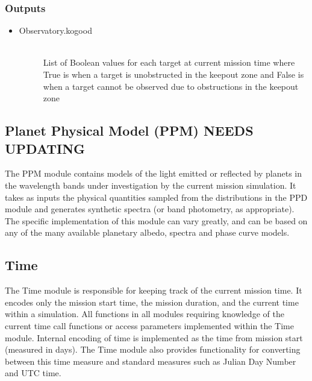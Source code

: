 \documentclass[cleanfoot]{asme2ej}
\begin{document}
\subsubsection*{Outputs}
\begin{itemize}
    \item 
    \begin{description}
        \item[Observatory.kogood] \hfill \\
        List of Boolean values for each target at current mission time where True is when a target is unobstructed in the keepout zone and False is when a target cannot be observed due to obstructions in the keepout zone
    \end{description}
\end{itemize}




\subsection{Planet Physical Model (PPM) NEEDS UPDATING}
The PPM module contains models of the light emitted or reflected by planets in the wavelength bands under investigation by the current mission simulation.  It takes as inputs the physical quantities sampled from the distributions in the PPD module and generates synthetic spectra (or band photometry, as appropriate).  The specific implementation of this module can vary greatly, and can be based on any of the many available planetary albedo, spectra and phase curve models.
\label{sec:planetphysicalmodel}


\subsection{Time} 
The Time module is responsible for keeping track of the current mission time.  It encodes only the mission start time, the mission duration, and the current time within a simulation.  All functions in all modules requiring knowledge of the current time call functions or access parameters implemented within the Time module.  Internal encoding of time is implemented as the time from mission start (measured in days).  The Time module also provides functionality for converting between this time measure and standard measures such as Julian Day Number and UTC time.
\end{document}
